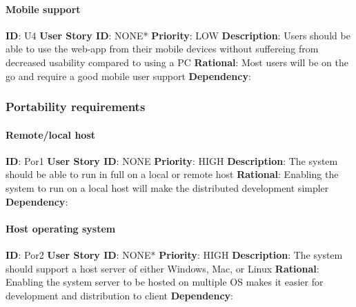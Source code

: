 \documentclass{article}
\begin{document}
\paragraph{Mobile support}\label{req:}
\textbf{ID}: U4\newline
\textbf{User Story ID}: NONE*\newline
\textbf{Priority}: LOW\newline
\textbf{Description}: Users should be able to use the web-app from their mobile devices without suffereing from decreased usability compared to using a PC\newline
\textbf{Rational}: Most users will be on the go and require a good mobile user support\newline
\textbf{Dependency}: \newline

\subsubsection{Portability requirements}

\paragraph{Remote/local host}\label{req:}
\textbf{ID}: Por1\newline
\textbf{User Story ID}: NONE\newline
\textbf{Priority}: HIGH\newline
\textbf{Description}: The system should be able to run in full on a local or remote host\newline
\textbf{Rational}: Enabling the system to run on a local host will make the distributed development simpler\newline
\textbf{Dependency}: \newline

\paragraph{Host operating system}\label{req:}
\textbf{ID}: Por2\newline
\textbf{User Story ID}: NONE*\newline
\textbf{Priority}: HIGH\newline
\textbf{Description}: The system should support a host server of either Windows, Mac, or Linux\newline
\textbf{Rational}: Enabling the system server to be hosted on multiple OS makes it easier for development and distribution to client\newline
\textbf{Dependency}: \newline
\end{document}
